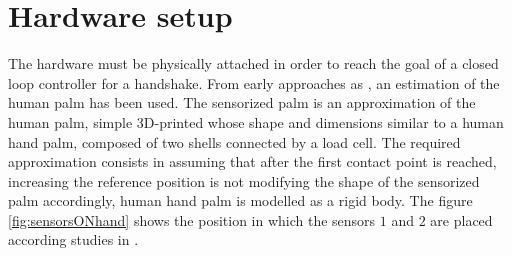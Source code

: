 \chapter{Hardware setup}
The hardware must be physically attached in order to reach the goal of a closed loop controller for a handshake. From early approaches as \cite{knoop2017handshakiness}, an estimation of the human palm has been used.  The sensorized palm is an approximation of the human palm, simple 3D-printed whose shape and dimensions similar to a human hand palm, composed of two shells connected by a load cell.
The required approximation consists in assuming that after the first contact point is reached, increasing the reference position is not modifying the shape of the sensorized palm accordingly, human hand palm is modelled as a rigid body. %
The figure \ref{fig:sensorsONhand} shows the position in which the sensors $1$ and $2$ are placed according studies in \cite{knoop2017handshakiness}. \\ \\

